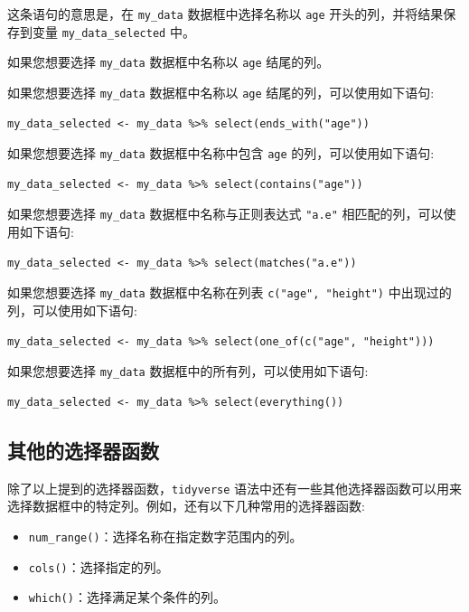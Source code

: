 \documentclass[
  letterpaper,
  DIV=11,
  numbers=noendperiod]{scrreprt}
\providecommand{\tightlist}{%
  \setlength{\itemsep}{0pt}\setlength{\parskip}{0pt}}\usepackage{longtable,booktabs,array}
\begin{document}
这条语句的意思是，在 \texttt{my\_data} 数据框中选择名称以 \texttt{age}
开头的列，并将结果保存到变量 \texttt{my\_data\_selected} 中。

如果您想要选择 \texttt{my\_data} 数据框中名称以 \texttt{age} 结尾的列。

如果您想要选择 \texttt{my\_data} 数据框中名称以 \texttt{age}
结尾的列，可以使用如下语句:

\begin{verbatim}
my_data_selected <- my_data %>% select(ends_with("age"))
\end{verbatim}

如果您想要选择 \texttt{my\_data} 数据框中名称中包含 \texttt{age}
的列，可以使用如下语句:

\begin{verbatim}
my_data_selected <- my_data %>% select(contains("age"))
\end{verbatim}

如果您想要选择 \texttt{my\_data} 数据框中名称与正则表达式 \texttt{"a.e"}
相匹配的列，可以使用如下语句:

\begin{verbatim}
my_data_selected <- my_data %>% select(matches("a.e"))
\end{verbatim}

如果您想要选择 \texttt{my\_data} 数据框中名称在列表
\texttt{c("age",\ "height")} 中出现过的列，可以使用如下语句:

\begin{verbatim}
my_data_selected <- my_data %>% select(one_of(c("age", "height")))
\end{verbatim}

如果您想要选择 \texttt{my\_data} 数据框中的所有列，可以使用如下语句:

\begin{verbatim}
my_data_selected <- my_data %>% select(everything())
\end{verbatim}

\hypertarget{ux5176ux4ed6ux7684ux9009ux62e9ux5668ux51fdux6570}{%
\subsection{其他的选择器函数}\label{ux5176ux4ed6ux7684ux9009ux62e9ux5668ux51fdux6570}}

除了以上提到的选择器函数，\texttt{tidyverse}
语法中还有一些其他选择器函数可以用来选择数据框中的特定列。例如，还有以下几种常用的选择器函数:

\begin{itemize}
\tightlist
\item
  \texttt{num\_range()}：选择名称在指定数字范围内的列。
\item
  \texttt{cols()}：选择指定的列。
\item
  \texttt{which()}：选择满足某个条件的列。
\end{itemize}
\end{document}
